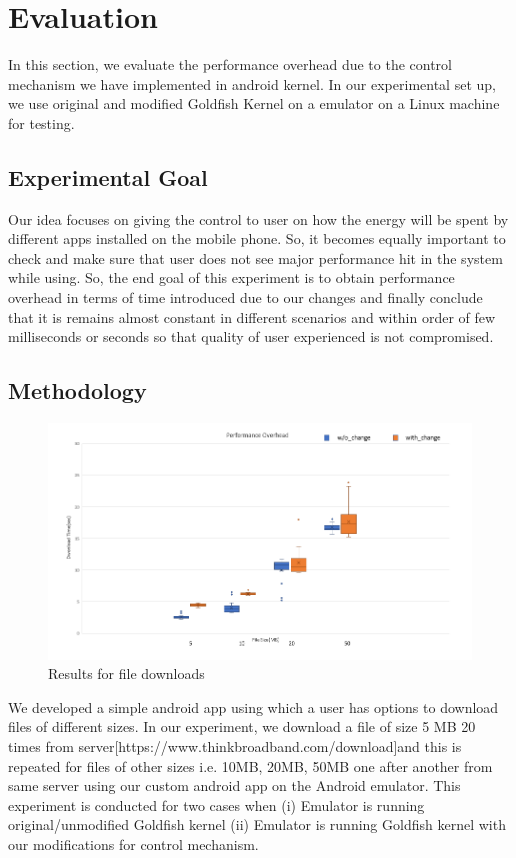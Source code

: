 \section{Evaluation}\label{evaluation}
In this section, we evaluate the performance overhead due to the control mechanism we have implemented in android kernel. In our experimental set up, we use original  and modified Goldfish Kernel on a emulator on a Linux machine for testing. 

\subsection{Experimental Goal}
Our idea focuses on  giving the control to  user on how the energy will be spent by different apps installed on the mobile phone. So, it becomes equally important to check and make sure that user does not see major performance hit in the system while using. So, the end goal of this  experiment is to obtain performance overhead in terms of time introduced due to our changes and finally conclude that it is remains almost constant in different scenarios and within order of few milliseconds or seconds so that quality of user experienced is not compromised.


\subsection{Methodology}
\begin{figure}[t]
	\centering
	\includegraphics[width=\linewidth]{Figs/boxplot}
	\caption{Results for file downloads}
	\label{fig:result}
	\centering
\end{figure}

We developed a simple android app using which a user has options to download files of different sizes. In our experiment, we download a file of size 5 MB 20 times from server[https://www.thinkbroadband.com/download]and this is  repeated for files of other sizes i.e. 10MB, 20MB, 50MB one after another from same server using our custom android app on the Android emulator. This experiment is conducted for two cases when (i) Emulator is running original/unmodified Goldfish kernel  (ii) Emulator is running Goldfish kernel with our modifications for control mechanism. 

